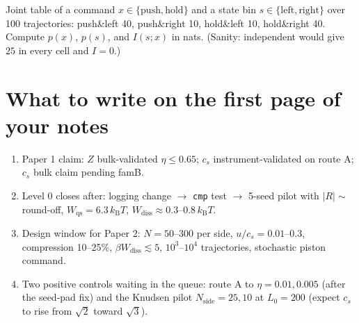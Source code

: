\documentclass[11pt,a4paper]{article}
\newcommand{\kT}{k_{\mathrm B}T}
\begin{document}
\begin{ex}[Exercise 7]
Joint table of a command $x\in\{\text{push},\text{hold}\}$ and a state bin $s\in\{\text{left},\text{right}\}$ over 100 trajectories: push\&left 40, push\&right 10, hold\&left 10, hold\&right 40. Compute $p(x)$, $p(s)$, and $I(s;x)$ in nats. (Sanity: independent would give $25$ in every cell and $I = 0$.)
\end{ex}

\section{What to write on the first page of your notes}
\begin{enumerate}[nosep]
\item Paper 1 claim: $Z$ bulk-validated $\eta\le0.65$; $c_s$ instrument-validated on route A; $c_s$ bulk claim pending famB.
\item Level 0 closes after: logging change $\to$ \texttt{cmp} test $\to$ 5-seed pilot with $|R|\sim$ round-off, $W_{\mathrm{qs}} = 6.3\,\kT$, $W_{\mathrm{diss}}\approx0.3$--$0.8\,\kT$.
\item Design window for Paper 2: $N = 50$--$300$ per side, $u/c_s = 0.01$--$0.3$, compression 10--25\%, $\beta W_{\mathrm{diss}}\lesssim5$, $10^3$--$10^4$ trajectories, stochastic piston command.
\item Two positive controls waiting in the queue: route A to $\eta = 0.01, 0.005$ (after the seed-pad fix) and the Knudsen pilot $N_{\mathrm{side}} = 25, 10$ at $L_0 = 200$ (expect $c_s$ to rise from $\sqrt2$ toward $\sqrt3$).
\end{enumerate}
\end{document}
